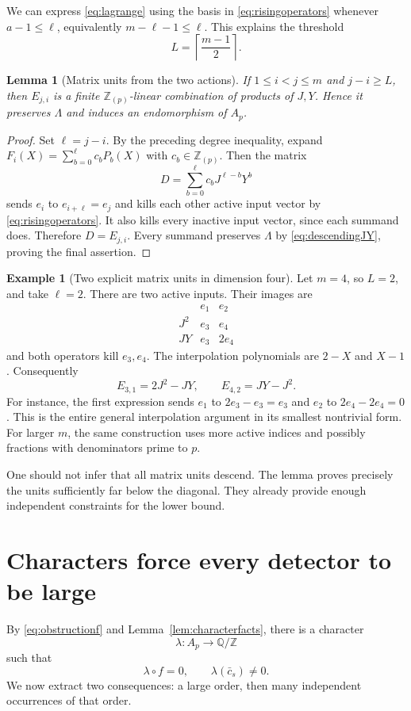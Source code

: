 \documentclass[11pt]{article}
\numberwithin{equation}{section}
\newtheorem{lemma}[theorem]{Lemma}
\theoremstyle{definition}
\newtheorem{example}[theorem]{Example}
\theoremstyle{remark}
\newcommand{\Z}{\mathbb Z}
\newcommand{\Q}{\mathbb Q}
\newcommand{\Rloc}{\mathbb Z_{(p)}}
\begin{document}
We can express \eqref{eq:lagrange} using the basis in \eqref{eq:risingoperators} whenever $a-1\le\ell$, equivalently $m-\ell-1\le\ell$. This explains the threshold
\[
L=\left\lceil\frac{m-1}{2}\right\rceil.
\]

\begin{lemma}[Matrix units from the two actions]\label{lem:matrixunits}
If $1\le i<j\le m$ and $j-i\ge L$, then $E_{j,i}$ is a finite $\Rloc$-linear combination of products of $J,Y$. Hence it preserves $\Lambda$ and induces an endomorphism of $A_p$.
\end{lemma}
\begin{proof}
Set $\ell=j-i$. By the preceding degree inequality, expand $F_i(X)=\sum_{b=0}^\ell c_bP_b(X)$ with $c_b\in\Rloc$. Then the matrix
\[
D=\sum_{b=0}^\ell c_bJ^{\ell-b}Y^b
\]
sends $e_i$ to $e_{i+\ell}=e_j$ and kills each other active input vector by \eqref{eq:risingoperators}. It also kills every inactive input vector, since each summand does. Therefore $D=E_{j,i}$. Every summand preserves $\Lambda$ by \eqref{eq:descendingJY}, proving the final assertion.
\end{proof}

\begin{example}[Two explicit matrix units in dimension four]\label{ex:matrixunits}
Let $m=4$, so $L=2$, and take $\ell=2$. There are two active inputs. Their images are
\[
\begin{array}{c|cc}
 &e_1&e_2\\\hline
J^2&e_3&e_4\\
JY&e_3&2e_4
\end{array}
\]
and both operators kill $e_3,e_4$. The interpolation polynomials are $2-X$ and $X-1$. Consequently
\[
E_{3,1}=2J^2-JY,\qquad E_{4,2}=JY-J^2.
\]
For instance, the first expression sends $e_1$ to $2e_3-e_3=e_3$ and $e_2$ to $2e_4-2e_4=0$. This is the entire general interpolation argument in its smallest nontrivial form. For larger $m$, the same construction uses more active indices and possibly fractions with denominators prime to $p$.
\end{example}

One should not infer that all matrix units descend. The lemma proves precisely the units sufficiently far below the diagonal. They already provide enough independent constraints for the lower bound.

\section{Characters force every detector to be large}\label{sec:characterbound}
By \eqref{eq:obstructionf} and Lemma~\ref{lem:characterfacts}, there is a character
\[
\lambda:A_p\longrightarrow\Q/\Z
\]
such that
\begin{equation}\label{eq:lambdachoice}
\lambda\circ f=0,\qquad \lambda(\bar c_s)\ne0.
\end{equation}
We now extract two consequences: a large order, then many independent occurrences of that order.
\end{document}
